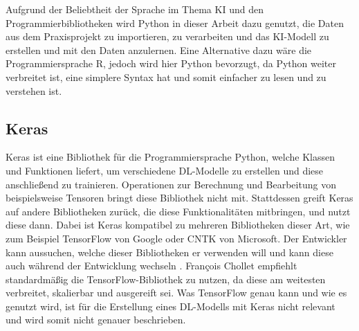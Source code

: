 Aufgrund der Beliebtheit der Sprache im Thema \ac{KI} und den Programmierbibliotheken wird Python in dieser Arbeit dazu genutzt,
die Daten aus dem Praxisprojekt zu importieren, zu verarbeiten und das \ac{KI}-Modell zu erstellen und mit den Daten anzulernen.
Eine Alternative dazu wäre die Programmiersprache R, jedoch wird hier Python bevorzugt, da Python weiter verbreitet ist, eine simplere Syntax hat und somit 
einfacher zu lesen und zu verstehen ist.

\subsection{Keras}
\label{chap:Keras}
Keras ist eine Bibliothek für die Programmiersprache Python, welche Klassen und Funktionen liefert, um verschiedene \ac{DL}-Modelle zu erstellen
und diese anschließend zu trainieren. Operationen zur Berechnung und Bearbeitung von beispielsweise Tensoren bringt diese Bibliothek nicht mit.
Stattdessen greift Keras auf andere Bibliotheken zurück, die diese Funktionalitäten mitbringen, und nutzt diese dann. Dabei ist Keras kompatibel zu mehreren
Bibliotheken dieser Art, wie zum Beispiel TensorFlow von Google oder CNTK von Microsoft. Der Entwickler kann aussuchen, welche dieser Bibliotheken er
verwenden will und kann diese auch während der Entwicklung wechseln \cite[vgl. S.89ff.]{DL_PY}. François Chollet empfiehlt standardmäßig die TensorFlow-Bibliothek zu nutzen, da diese 
\glqq am weitesten verbreitet, skalierbar und ausgereift\grqq{} \cite[S.91]{DL_PY} sei. Was TensorFlow genau kann und wie es genutzt wird, ist für die Erstellung eines
\ac{DL}-Modells mit Keras nicht relevant und wird somit nicht genauer beschrieben.

